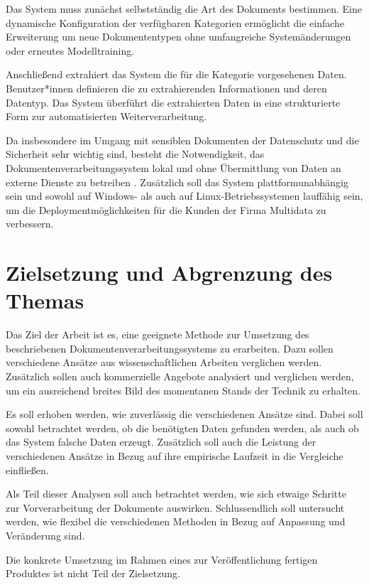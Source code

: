 Das System muss zunächst selbstständig die Art des Dokuments bestimmen. Eine dynamische Konfiguration der verfügbaren Kategorien ermöglicht die einfache Erweiterung um neue Dokumententypen ohne umfangreiche Systemänderungen oder erneutes Modelltraining.

Anschließend extrahiert das System die für die Kategorie vorgesehenen Daten. Benutzer*innen definieren die zu extrahierenden Informationen und deren Datentyp. Das System überführt die extrahierten Daten in eine strukturierte Form zur automatisierten Weiterverarbeitung.

Da insbesondere im Umgang mit sensiblen Dokumenten der Datenschutz und die Sicherheit sehr wichtig sind, besteht die Notwendigkeit, das Dokumentenverarbeitungssystem lokal und ohne Übermittlung von Daten an externe Dienste zu betreiben \cite{HuangYupan2022LPfD}. Zusätzlich soll das System plattformunabhängig sein und sowohl auf Windows- als auch auf Linux-Betriebssystemen lauffähig sein, um die Deploymentmöglichkeiten für die Kunden der Firma Multidata zu verbessern.

\section{Zielsetzung und Abgrenzung des Themas}
\label{sec:zielsetzung-und-abgrenzung}

Das Ziel der Arbeit ist es, eine geeignete Methode zur Umsetzung des beschriebenen Dokumentenverarbeitungssystems zu erarbeiten. Dazu sollen verschiedene Ansätze aus wissenschaftlichen Arbeiten verglichen werden. Zusätzlich sollen auch kommerzielle Angebote analysiert und verglichen werden, um ein ausreichend breites Bild des momentanen Stands der Technik zu erhalten.

Es soll erhoben werden, wie zuverlässig die verschiedenen Ansätze sind. Dabei soll sowohl betrachtet werden, ob die benötigten Daten gefunden werden, als auch ob das System falsche Daten erzeugt. Zusätzlich soll auch die Leistung der verschiedenen Ansätze in Bezug auf ihre empirische Laufzeit in die Vergleiche einfließen.

Als Teil dieser Analysen soll auch betrachtet werden, wie sich etwaige Schritte zur Vorverarbeitung der Dokumente auswirken. Schlussendlich soll untersucht werden, wie flexibel die verschiedenen Methoden in Bezug auf Anpassung und Veränderung sind.

Die konkrete Umsetzung im Rahmen eines zur Veröffentlichung fertigen Produktes ist nicht Teil der Zielsetzung.

